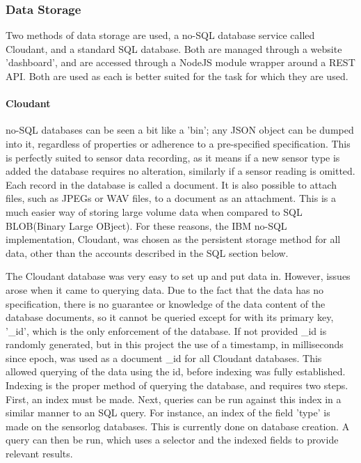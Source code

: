 \documentclass{article}
\begin{document}
\subsubsection{Data Storage}
Two methods of data storage are used, a no-SQL database service called Cloudant, and a standard SQL database. Both are managed through a website 'dashboard', and are accessed through a NodeJS module wrapper around a REST API. Both are used as each is better suited for the task for which they are used.
\paragraph{Cloudant}
no-SQL databases can be seen a bit like a 'bin'; any JSON object can be dumped into it, regardless of properties or adherence to a pre-specified specification. This is perfectly suited to sensor data recording, as it means if a new sensor type is added the database requires no alteration, similarly if a sensor reading is omitted. Each record in the database is called a document. It is also possible to attach files, such as JPEGs or WAV files, to a document as an attachment. This is a much easier way of storing large volume data when compared to SQL BLOB(Binary Large OBject). For these reasons, the IBM no-SQL implementation, Cloudant, was chosen as the persistent storage method for all data, other than the accounts described in the SQL section below. 

The Cloudant database was very easy to set up and put data in. However, issues arose when it came to querying data. Due to the fact that the data has no specification, there is no guarantee or knowledge of the data content of the database documents, so it cannot be queried except for with its primary key, '\_id', which is the only enforcement of the database. If not provided \_id is randomly generated, but in this project the use of a timestamp, in milliseconds since epoch, was used as a document \_id for all Cloudant databases. This allowed querying of the data using the id, before indexing was fully established. Indexing is the proper method of querying the database, and requires two steps. First, an index must be made. Next, queries can be run against this index in a similar manner to an SQL query. For instance, an index of the field 'type' is made on the sensorlog databases. This is currently done on database creation. A query can then be run, which uses a selector and the indexed fields to provide relevant results.
\end{document}
